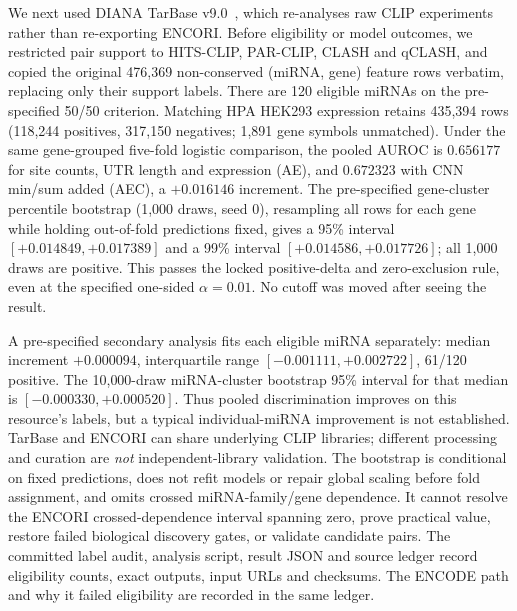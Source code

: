 \documentclass[11pt]{article}
\begin{document}
We next used DIANA TarBase v9.0~\cite{tarbase}, which re-analyses raw CLIP
experiments rather than re-exporting ENCORI. Before eligibility or model
outcomes, we restricted pair support to HITS-CLIP, PAR-CLIP, CLASH and qCLASH,
and copied the original 476{,}369 non-conserved (miRNA, gene) feature rows
verbatim, replacing only their support labels. There are 120 eligible miRNAs
on the pre-specified 50/50 criterion. Matching HPA HEK293 expression retains
435{,}394 rows (118{,}244 positives, 317{,}150 negatives; 1{,}891 gene symbols
unmatched). Under the same gene-grouped five-fold logistic comparison, the
pooled AUROC is $0.656177$ for site counts, UTR length and expression (AE),
and $0.672323$ with CNN min/sum added (AEC), a $+0.016146$ increment. The
pre-specified gene-cluster percentile bootstrap (1{,}000 draws, seed 0),
resampling all rows for each gene while holding out-of-fold predictions fixed,
gives a 95\% interval $[+0.014849,+0.017389]$ and a 99\% interval
$[+0.014586,+0.017726]$; all 1{,}000 draws are positive. This passes the
locked positive-delta and zero-exclusion rule, even at the specified
one-sided $\alpha=0.01$. No cutoff was moved after seeing the result.

A pre-specified secondary analysis fits each eligible miRNA separately:
median increment $+0.000094$, interquartile range
$[-0.001111,+0.002722]$, 61/120 positive. The 10{,}000-draw miRNA-cluster
bootstrap 95\% interval for that median is $[-0.000330,+0.000520]$. Thus
pooled discrimination improves on this resource's labels, but a typical
individual-miRNA improvement is not established. TarBase and ENCORI can
share underlying CLIP libraries; different processing and curation are
\emph{not} independent-library validation. The bootstrap is conditional on
fixed predictions, does not refit models or repair global scaling before
fold assignment, and omits crossed miRNA-family/gene dependence. It cannot
resolve the ENCORI crossed-dependence interval spanning zero, prove practical
value, restore failed biological discovery gates, or validate candidate pairs.
The committed label audit, analysis script, result JSON and source ledger
record eligibility counts, exact outputs, input URLs and checksums. The
ENCODE path and why it failed eligibility are recorded in the same ledger.
\end{document}
